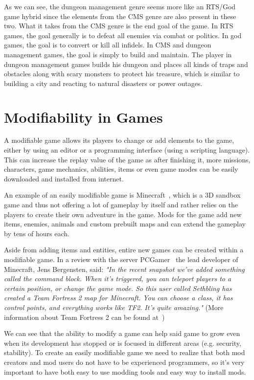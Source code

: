 As we can see, the dungeon management genre seems more like an RTS/God game hybrid since the elements from the CMS genre are also present in these two.
What it takes from the CMS genre is the end goal of the game. In RTS games, the goal generally is to defeat all enemies via combat or politics.
In god games, the goal is to convert or kill all infidels. In CMS and dungeon management games, the goal is simply to build and maintain. The player in dungeon
management games builds his dungeon and places all kinds of traps and obstacles along with scary monsters to protect his treasure, which is similar to building
a city and reacting to natural disasters or power outages.

\section{Modifiability in Games}

A modifiable game allows its players to change or add elements to the game, either by using an editor or a programming interface (using a scripting language). 
This can increase the replay value of the game as after finishing it, more missions, characters, game mechanics, abilities, items or even game modes can be
easily downloaded and installed from internet.

An example of an easily modifiable game is Minecraft~\cite{Minecraft}, which is a 3D sandbox game and thus not offering a lot of gameplay by itself and rather
relies on the players to create their own adventure in the game. Mods for the game add new items, enemies, animals and custom prebuilt maps and
can extend the gameplay by tens of hours each.

Aside from adding items and entities, entire new games can be created within a modifiable game. In a review with the server PCGamer~\cite{FutureOfMinecraft}
the lead developer of Minecraft, Jens Bergensten, said:
\emph{"In the recent snapshot we've added something called the command block. When it's triggered, you can teleport players to a certain position, or change the game mode.
So this user called Sethbling has created a Team Fortress 2 map for Minecraft. You can choose a class, it has control points,
and everything works like TF2. It's quite amazing."} (More information about Team Fortress 2 can be found at~\cite{TF2})

We can see that the ability to modify a game can help said game to grow even when its development has stopped or is focused in different areas (e.g. security, stability).
To create an easily modifiable game we need to realize that both mod creators and mod users do not have to be experienced programmers, so it's very important to have both easy to use
modding tools and easy way to install mods.

